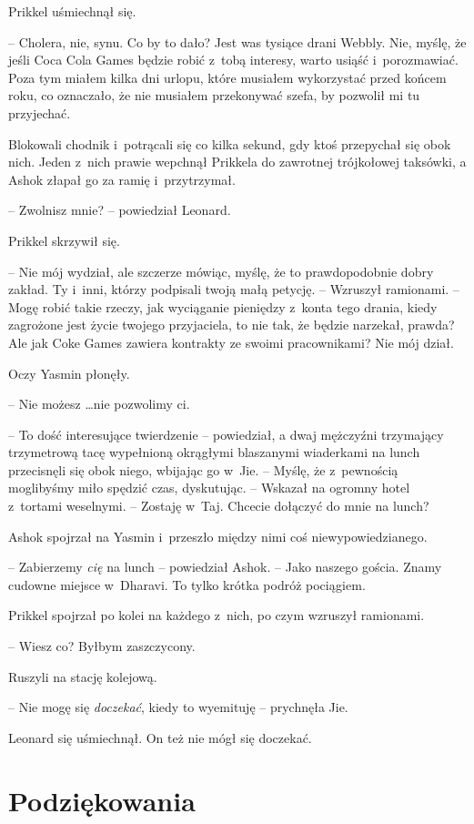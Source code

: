 \documentclass[oneside,polish,11pt,rmheadings]{mwbk}
\begin{document}
Prikkel uśmiechnął się. 

-- Cholera, nie, synu. Co by to dało? Jest was tysiące drani Webbly. Nie, myślę, że jeśli Coca Cola Games będzie robić z~tobą interesy, warto usiąść i~porozmawiać. Poza tym miałem kilka dni urlopu, które musiałem wykorzystać przed końcem roku, co oznaczało, że nie musiałem przekonywać szefa, by pozwolił mi tu przyjechać.

Blokowali chodnik i~potrącali się co kilka sekund, gdy ktoś przepychał się obok nich. Jeden z~nich prawie wepchnął Prikkela do zawrotnej trójkołowej taksówki, a Ashok złapał go za ramię i~przytrzymał.

-- Zwolnisz mnie? -- powiedział Leonard.

Prikkel skrzywił się. 

-- Nie mój wydział, ale szczerze mówiąc, myślę, że to prawdopodobnie dobry zakład. Ty i~inni, którzy podpisali twoją małą petycję. -- Wzruszył ramionami. -- Mogę robić takie rzeczy, jak wyciąganie pieniędzy z~konta tego drania, kiedy zagrożone jest życie twojego przyjaciela, to nie tak, że będzie narzekał, prawda? Ale jak Coke Games zawiera kontrakty ze swoimi pracownikami? Nie mój dział.

Oczy Yasmin płonęły. 

-- Nie możesz \ldots  nie pozwolimy ci.

-- To dość interesujące twierdzenie -- powiedział, a dwaj mężczyźni trzymający trzymetrową tacę wypełnioną okrągłymi blaszanymi wiaderkami na lunch przecisnęli się obok niego, wbijając go w~Jie. -- Myślę, że z~pewnością moglibyśmy miło spędzić czas, dyskutując. -- Wskazał na ogromny hotel z~tortami weselnymi. -- Zostaję w~Taj. Chcecie dołączyć do mnie na lunch?

Ashok spojrzał na Yasmin i~przeszło między nimi coś niewypowiedzianego. 

-- Zabierzemy \textit{cię }na lunch -- powiedział Ashok. -- Jako naszego gościa. Znamy cudowne miejsce w~Dharavi. To tylko krótka podróż pociągiem. 

Prikkel spojrzał po kolei na każdego z~nich, po czym wzruszył ramionami. 

-- Wiesz co? Byłbym zaszczycony.

Ruszyli na stację kolejową. 

-- Nie mogę się \textit{doczekać}, kiedy to wyemituję -- prychnęła Jie.

Leonard się uśmiechnął. On też nie mógł się doczekać. 

\chapter*{Podziękowania}  
\end{document}
